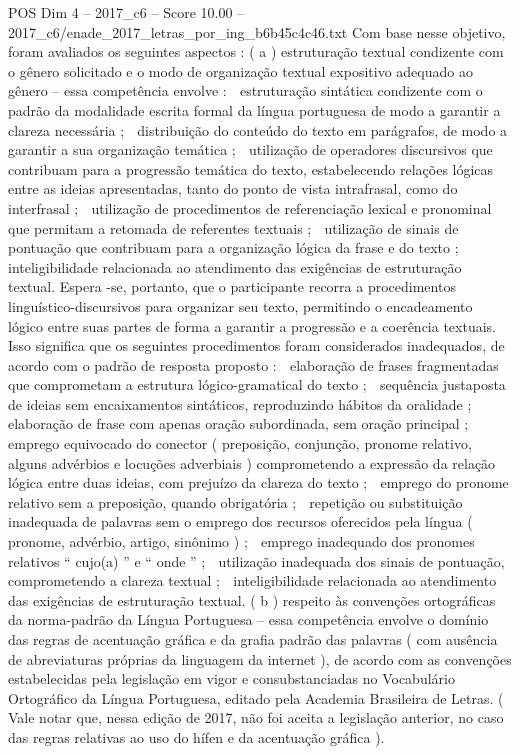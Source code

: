 \begin{textsample}{POS Dim 4 – 2017\_c6 – Score 10.00 – 2017\_c6/enade\_2017\_letras\_por\_ing\_b6b45c4c46.txt}
Com base nesse objetivo, foram avaliados os seguintes aspectos : ( a ) estruturação textual condizente com o gênero solicitado e o modo de organização textual expositivo adequado ao gênero – essa competência envolve :  estruturação sintática condizente com o padrão da modalidade escrita formal da língua portuguesa de modo a garantir a clareza necessária ;  distribuição do conteúdo do texto em parágrafos, de modo a garantir a sua organização temática ;  utilização de operadores discursivos que contribuam para a progressão temática do texto, estabelecendo relações lógicas entre as ideias apresentadas, tanto do ponto de vista intrafrasal, como do interfrasal ;  utilização de procedimentos de referenciação lexical e pronominal que permitam a retomada de referentes textuais ;  utilização de sinais de pontuação que contribuam para a organização lógica da frase e do texto ;  inteligibilidade relacionada ao atendimento das exigências de estruturação textual.
Espera -se, portanto, que o participante recorra a procedimentos linguístico-discursivos para organizar seu texto, permitindo o encadeamento lógico entre suas partes de forma a garantir a progressão e a coerência textuais.
Isso significa que os seguintes procedimentos foram considerados inadequados, de acordo com o padrão de resposta proposto :  elaboração de frases fragmentadas que comprometam a estrutura lógico-gramatical do texto ;  sequência justaposta de ideias sem encaixamentos sintáticos, reproduzindo hábitos da oralidade ;  elaboração de frase com apenas oração subordinada, sem oração principal ;  emprego equivocado do conector ( preposição, conjunção, pronome relativo, alguns advérbios e locuções adverbiais ) comprometendo a expressão da relação lógica entre duas ideias, com prejuízo da clareza do texto ;  emprego do pronome relativo sem a preposição, quando obrigatória ;  repetição ou substituição inadequada de palavras sem o emprego dos recursos oferecidos pela língua ( pronome, advérbio, artigo, sinônimo ) ;  emprego inadequado dos pronomes relativos “ cujo(a) ” e “ onde ” ;  utilização inadequada dos sinais de pontuação, comprometendo a clareza textual ;  inteligibilidade relacionada ao atendimento das exigências de estruturação textual. ( b ) respeito às convenções ortográficas da norma-padrão da Língua Portuguesa – essa competência envolve o domínio das regras de acentuação gráfica e da grafia padrão das palavras ( com ausência de abreviaturas próprias da linguagem da internet ), de acordo com as convenções estabelecidas pela legislação em vigor e consubstanciadas no Vocabulário Ortográfico da Língua Portuguesa, editado pela Academia Brasileira de Letras. ( Vale notar que, nessa edição de 2017, não foi aceita a legislação anterior, no caso das regras relativas ao uso do hífen e da acentuação gráfica ).

\end{textsample}
